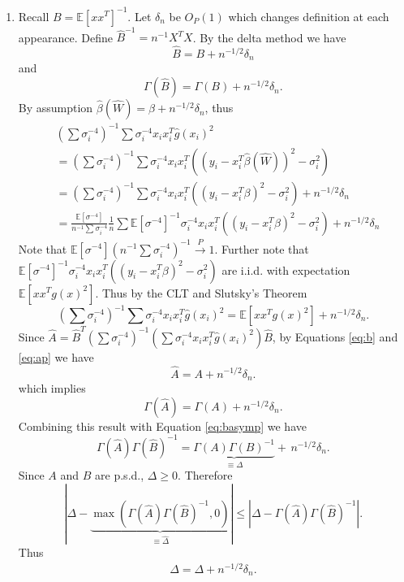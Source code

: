 \documentclass[ejs,ps,preprint]{imsart}
\numberwithin{equation}{section}
\theoremstyle{plain}
\newcommand{\E}{\mathbb{E}}
\newcommand{\rightarrowp}{\overset{P}{\to}}
\def\E{\mathbb{E}}
\begin{document}
\begin{enumerate}
\item \label{part:i_sat} Recall $B = \E[xx^T]^{-1}$. Let $\delta_n$ be $O_P(1)$ which changes definition at each appearance. Define $\widehat{B}^{-1} = n^{-1}X^TX$. By the delta method we have
\begin{equation}
\label{eq:b}
\widehat{B} = B + n^{-1/2}\delta_n
\end{equation}
and
\begin{equation}
\label{eq:basymp}
\Gamma(\widehat{B}) = \Gamma(B) + n^{-1/2}\delta_n.
\end{equation}
By assumption $\widehat{\beta}(\widehat{W}) = \beta + n^{-1/2}\delta_n$, thus
\begin{align*}
  &\left(\sum \sigma_i^{-4}\right)^{-1} \sum \sigma_i^{-4} x_ix_i^T \widehat{g}(x_i)^2 \\
  &= \left(\sum \sigma_i^{-4}\right)^{-1} \sum \sigma_i^{-4} x_ix_i^T ((y_i - x_i^T\widehat{\beta}(\widehat{W}))^2 - \sigma_i^2)\\
&= \left(\sum \sigma_i^{-4}\right)^{-1} \sum \sigma_i^{-4} x_ix_i^T ((y_i - x_i^T\beta)^2 - \sigma_i^2) + n^{-1/2}\delta_n\\
&= \frac{\E[\sigma^{-4}]}{n^{-1}\sum \sigma_i^{-4}}\frac{1}{n} \sum \E[\sigma^{-4}]^{-1}\sigma_i^{-4} x_ix_i^T ((y_i - x_i^T\beta)^2 - \sigma_i^2) + n^{-1/2}\delta_n
\end{align*}
Note that $\E[\sigma^{-4}](n^{-1}\sum \sigma_i^{-4})^{-1} \rightarrowp 1$. Further note that $\E[\sigma^{-4}]^{-1}\sigma_i^{-4} x_ix_i^T ((y_i - x_i^T\beta)^2 - \sigma_i^2)$ are i.i.d. with expectation $\E[xx^Tg(x)^2]$. Thus by the CLT and Slutsky's Theorem
\begin{equation}
\label{eq:ap}
\left(\sum \sigma_i^{-4}\right)^{-1}\sum \sigma_i^{-4}x_ix_i^T\widehat{g}(x_i)^2 = \E[xx^Tg(x)^2] + n^{-1/2}\delta_n.
\end{equation}
Since $\widehat{A} = \widehat{B}^T\left(\sum \sigma_i^{-4}\right)^{-1}\left(\sum \sigma_i^{-4}x_ix_i^T\widehat{g}(x_i)^2\right)\widehat{B}$, by Equations \eqref{eq:b} and \eqref{eq:ap} we have
\begin{equation*}
\widehat{A} = A + n^{-1/2}\delta_n.
\end{equation*}
which implies
\begin{equation*}
\Gamma(\widehat{A}) = \Gamma(A) + n^{-1/2}\delta_n.
\end{equation*}
Combining this result with Equation \eqref{eq:basymp} we have
\begin{equation*}
\Gamma(\widehat{A})\Gamma(\widehat{B})^{-1} = \underbrace{\Gamma(A)\Gamma(B)^{-1}}_{\equiv \Delta} + \, n^{-1/2}\delta_n.
\end{equation*}
Since $A$ and $B$ are p.s.d., $\Delta \geq 0$. Therefore
\begin{equation*}
|\Delta - \underbrace{\max(\Gamma(\widehat{A})\Gamma(\widehat{B})^{-1},0)}_{\equiv \widehat{\Delta}}| \leq |\Delta - \Gamma(\widehat{A})\Gamma(\widehat{B})^{-1}|.
\end{equation*}
Thus
\begin{equation*}
\widehat{\Delta} = \Delta + n^{-1/2}\delta_n.
\end{equation*}




\end{enumerate}
\end{document}
